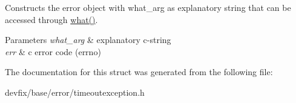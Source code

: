 Constructs the error object with what\+\_\+arg as explanatory string that can be accessed through \hyperlink{structdevfix_1_1base_1_1error_1_1baseexception_a16327152a55d65b1e537825231fbd452}{what()}. 
\begin{DoxyParams}{Parameters}
{\em what\+\_\+arg} & explanatory c-\/string \\
\hline
{\em err} & c error code (errno) \\
\hline
\end{DoxyParams}


The documentation for this struct was generated from the following file\+:\begin{DoxyCompactItemize}
\item 
devfix/base/error/timeoutexception.\+h\end{DoxyCompactItemize}
